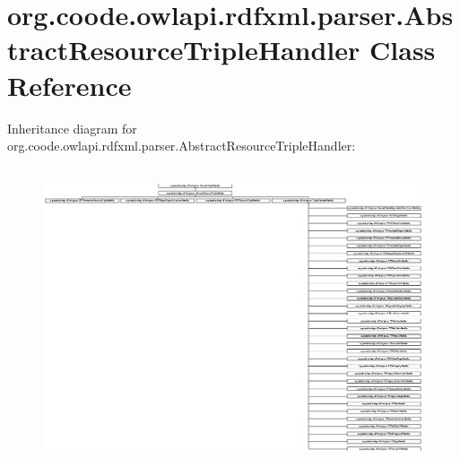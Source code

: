 \hypertarget{classorg_1_1coode_1_1owlapi_1_1rdfxml_1_1parser_1_1_abstract_resource_triple_handler}{\section{org.\-coode.\-owlapi.\-rdfxml.\-parser.\-Abstract\-Resource\-Triple\-Handler Class Reference}
\label{classorg_1_1coode_1_1owlapi_1_1rdfxml_1_1parser_1_1_abstract_resource_triple_handler}
}
Inheritance diagram for org.\-coode.\-owlapi.\-rdfxml.\-parser.\-Abstract\-Resource\-Triple\-Handler\-:\begin{figure}[H]
\begin{center}
\leavevmode
\includegraphics[height=8.861538cm]{classorg_1_1coode_1_1owlapi_1_1rdfxml_1_1parser_1_1_abstract_resource_triple_handler}
\end{center}
\end{figure}
